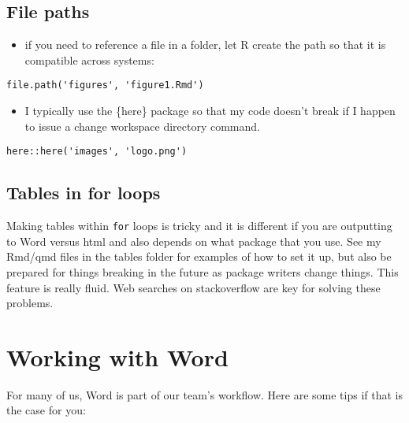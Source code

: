 \documentclass[
  letterpaper,
  oneside]{scrbook}
\providecommand{\tightlist}{%
  \setlength{\itemsep}{0pt}\setlength{\parskip}{0pt}}\usepackage{longtable,booktabs,array}
\begin{document}
\hypertarget{file-paths}{%
\subsection{File paths}\label{file-paths}}

\begin{itemize}
\tightlist
\item
  if you need to reference a file in a folder, let R create the path so
  that it is compatible across systems:
\end{itemize}

\begin{verbatim}
file.path('figures', 'figure1.Rmd')
\end{verbatim}

\begin{itemize}
\tightlist
\item
  I typically use the \{here\} package so that my code doesn't break if
  I happen to issue a change workspace directory command.
\end{itemize}

\begin{verbatim}
here::here('images', 'logo.png')
\end{verbatim}

\hypertarget{tables-in-for-loops}{%
\subsection{Tables in for loops}\label{tables-in-for-loops}}

Making tables within \texttt{for} loops is tricky and it is different if
you are outputting to Word versus html and also depends on what package
that you use. See my Rmd/qmd files in the tables folder for examples of
how to set it up, but also be prepared for things breaking in the future
as package writers change things. This feature is really fluid. Web
searches on stackoverflow are key for solving these problems.

\hypertarget{working-with-word}{%
\section{Working with Word}\label{working-with-word}}

For many of us, Word is part of our team's workflow. Here are some tips
if that is the case for you:
\end{document}
